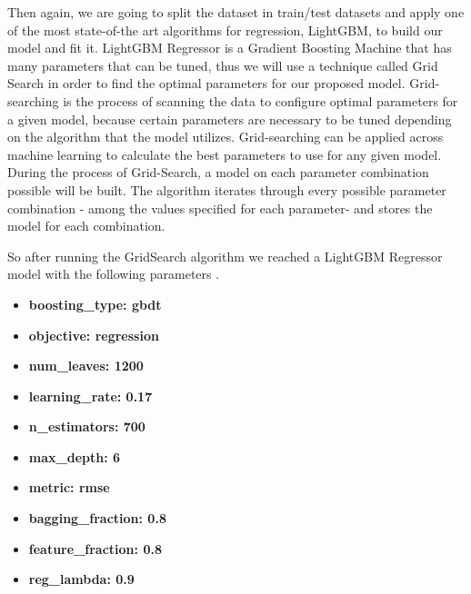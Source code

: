 \par Then again, we are going to split the dataset in train/test datasets and apply one of the most state-of-the art algorithms for regression, LightGBM, to build our model and fit it. LightGBM Regressor is a Gradient Boosting Machine that has many parameters that can be tuned, thus we will use a technique called Grid Search in order to find the optimal parameters for our proposed model. Grid-searching is the process of scanning the data to configure optimal parameters for a given model, because certain parameters are necessary to be tuned depending on the algorithm that the model utilizes.  Grid-searching can be applied across machine learning to calculate the best parameters to use for any given model. During the process of Grid-Search, a model on each parameter combination possible will be built. The algorithm iterates through every possible parameter combination - among the values specified for each parameter- and stores the model for each combination. 
\newpage
\par So after running the GridSearch algorithm we reached a LightGBM Regressor model with the following parameters \cite{lightgbm}.
\begin{itemize}
    \item \textbf{boosting\_type: gbdt}
    \item \textbf{objective: regression}
    \item \textbf{num\_leaves: 1200}
    \item \textbf{learning\_rate: 0.17}
    \item \textbf{n\_estimators: 700}
    \item \textbf{max\_depth: 6}
    \item \textbf{metric: rmse}
    \item \textbf{bagging\_fraction: 0.8}
    \item \textbf{feature\_fraction: 0.8}
    \item \textbf{reg\_lambda: 0.9}
\end{itemize}

